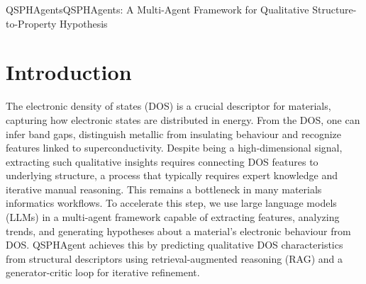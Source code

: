 
\begin{teamsubmission}{QSPHAgents}{QSPHAgents: A Multi-Agent Framework for Qualitative Structure-to-Property Hypothesis}

\section*{Introduction}

The electronic density of states (DOS) is a crucial descriptor for materials, capturing how electronic states are distributed in energy. From the DOS, one can infer band gaps, distinguish metallic from insulating behaviour and recognize features linked to superconductivity. Despite being a high-dimensional signal, extracting such qualitative insights requires connecting DOS features to underlying structure, a process that typically requires expert knowledge and iterative manual reasoning. This remains a bottleneck in many materials informatics workflows. To accelerate this step, we use large language models (LLMs) \cite{singh2024,Lei2024} in a multi-agent framework capable of extracting features, analyzing trends, and generating hypotheses about a material’s electronic behaviour from DOS. QSPHAgent achieves this by predicting qualitative DOS characteristics from structural descriptors using retrieval-augmented reasoning (RAG) and a generator-critic loop for iterative refinement.



\end{teamsubmission}
